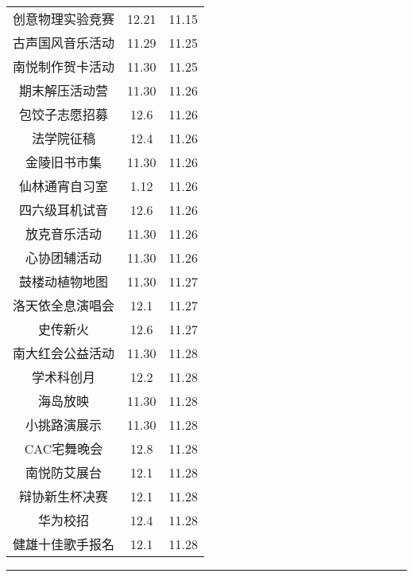 \documentclass[letterpaper, 12pt]{article}
\begin{document}
\begin{multicols}{2}
{\begin{longtable}{|c|c|c|}
    创意物理实验竞赛 & 12.21 & 11.15\\
    古声国风音乐活动 & 11.29 & 11.25\\
    南悦制作贺卡活动 & 11.30 & 11.25\\
    期末解压活动营 & 11.30 & 11.26\\
    包饺子志愿招募 & 12.6 & 11.26\\
    法学院征稿 & 12.4 & 11.26\\
    金陵旧书市集 & 11.30 & 11.26\\
    仙林通宵自习室 & 1.12 & 11.26\\
    四六级耳机试音 & 12.6 & 11.26\\
    放克音乐活动 & 11.30 & 11.26\\
    心协团辅活动 & 11.30 & 11.26\\
    鼓楼动植物地图 & 11.30 & 11.27\\
    洛天依全息演唱会 & 12.1 & 11.27\\
    史传新火 & 12.6 & 11.27\\
    南大红会公益活动 & 11.30 & 11.28\\
    学术科创月 & 12.2 & 11.28\\
    海岛放映 & 11.30 & 11.28\\
    小挑路演展示 & 11.30 & 11.28\\
    CAC宅舞晚会 & 12.8 & 11.28\\
    南悦防艾展台 & 12.1 & 11.28\\
    辩协新生杯决赛 & 12.1 & 11.28\\
    华为校招 & 12.4 & 11.28\\
    健雄十佳歌手报名 & 12.1 & 11.28\\
    \hline
\end{longtable}
\unskip
\unpenalty
\unpenalty}\unvbox\colbbox
\end{multicols}
\hrule
\pagebreak
\end{document}
